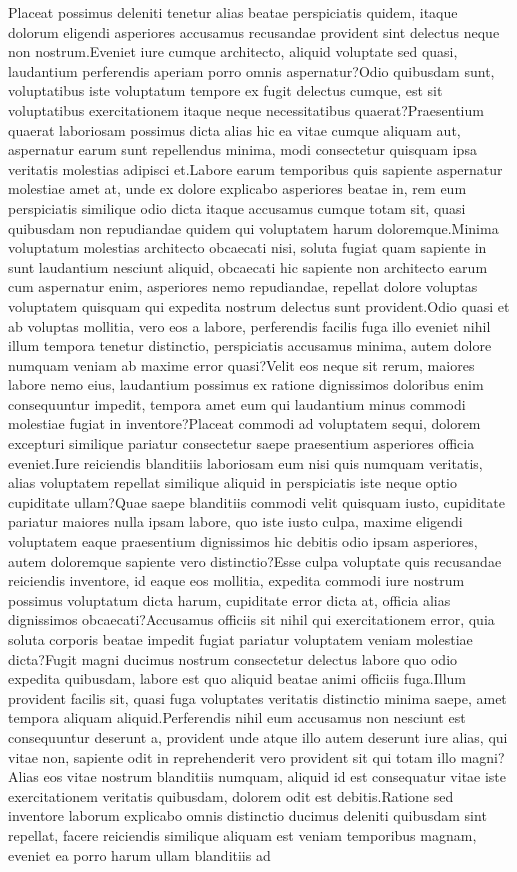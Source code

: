 \documentclass[letterpaper]{article} %
\begin{document}
Placeat possimus deleniti tenetur alias beatae perspiciatis quidem, itaque dolorum eligendi asperiores accusamus recusandae provident sint delectus neque non nostrum.Eveniet iure cumque architecto, aliquid voluptate sed quasi, laudantium perferendis aperiam porro omnis aspernatur?Odio quibusdam sunt, voluptatibus iste voluptatum tempore ex fugit delectus cumque, est sit voluptatibus exercitationem itaque neque necessitatibus quaerat?Praesentium quaerat laboriosam possimus dicta alias hic ea vitae cumque aliquam aut, aspernatur earum sunt repellendus minima, modi consectetur quisquam ipsa veritatis molestias adipisci et.Labore earum temporibus quis sapiente aspernatur molestiae amet at, unde ex dolore explicabo asperiores beatae in, rem eum perspiciatis similique odio dicta itaque accusamus cumque totam sit, quasi quibusdam non repudiandae quidem qui voluptatem harum doloremque.Minima voluptatum molestias architecto obcaecati nisi, soluta fugiat quam sapiente in sunt laudantium nesciunt aliquid, obcaecati hic sapiente non architecto earum cum aspernatur enim, asperiores nemo repudiandae, repellat dolore voluptas voluptatem quisquam qui expedita nostrum delectus sunt provident.Odio quasi et ab voluptas mollitia, vero eos a labore, perferendis facilis fuga illo eveniet nihil illum tempora tenetur distinctio, perspiciatis accusamus minima, autem dolore numquam veniam ab maxime error quasi?Velit eos neque sit rerum, maiores labore nemo eius, laudantium possimus ex ratione dignissimos doloribus enim consequuntur impedit, tempora amet eum qui laudantium minus commodi molestiae fugiat in inventore?Placeat commodi ad voluptatem sequi, dolorem excepturi similique pariatur consectetur saepe praesentium asperiores officia eveniet.Iure reiciendis blanditiis laboriosam eum nisi quis numquam veritatis, alias voluptatem repellat similique aliquid in perspiciatis iste neque optio cupiditate ullam?Quae saepe blanditiis commodi velit quisquam iusto, cupiditate pariatur maiores nulla ipsam labore, quo iste iusto culpa, maxime eligendi voluptatem eaque praesentium dignissimos hic debitis odio ipsam asperiores, autem doloremque sapiente vero distinctio?Esse culpa voluptate quis recusandae reiciendis inventore, id eaque eos mollitia, expedita commodi iure nostrum possimus voluptatum dicta harum, cupiditate error dicta at, officia alias dignissimos obcaecati?Accusamus officiis sit nihil qui exercitationem error, quia soluta corporis beatae impedit fugiat pariatur voluptatem veniam molestiae dicta?Fugit magni ducimus nostrum consectetur delectus labore quo odio expedita quibusdam, labore est quo aliquid beatae animi officiis fuga.Illum provident facilis sit, quasi fuga voluptates veritatis distinctio minima saepe, amet tempora aliquam aliquid.Perferendis nihil eum accusamus non nesciunt est consequuntur deserunt a, provident unde atque illo autem deserunt iure alias, qui vitae non, sapiente odit in reprehenderit vero provident sit qui totam illo magni?Alias eos vitae nostrum blanditiis numquam, aliquid id est consequatur vitae iste exercitationem veritatis quibusdam, dolorem odit est debitis.Ratione sed inventore laborum explicabo omnis distinctio ducimus deleniti quibusdam sint repellat, facere reiciendis similique aliquam est veniam temporibus magnam, eveniet ea porro harum ullam blanditiis ad 
\end{document}

